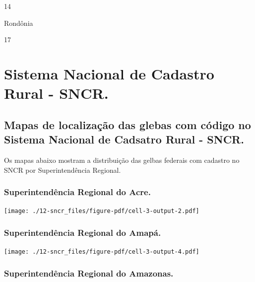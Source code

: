 \documentclass[
  letterpaper,
]{report}
\begin{document}
\n      

14

\n    

\n    

\n      

Rondônia

\n      

17

\n    

\n  

\n


\hypertarget{sistema-nacional-de-cadastro-rural---sncr.}{%
\chapter{Sistema Nacional de Cadastro Rural -
SNCR.}\label{sistema-nacional-de-cadastro-rural---sncr.}}

\hypertarget{mapas-de-localizauxe7uxe3o-das-glebas-com-cuxf3digo-no-sistema-nacional-de-cadsatro-rural---sncr.}{%
\section{Mapas de localização das glebas com código no Sistema Nacional
de Cadsatro Rural -
SNCR.}\label{mapas-de-localizauxe7uxe3o-das-glebas-com-cuxf3digo-no-sistema-nacional-de-cadsatro-rural---sncr.}}

Os mapas abaixo mostram a distribuição das gelbas federais com cadastro
no SNCR por Superintendência Regional.

\hypertarget{superintenduxeancia-regional-do-acre.-2}{%
\subsection{Superintendência Regional do
Acre.}\label{superintenduxeancia-regional-do-acre.-2}}

\texttt{[image: ./12-sncr\_files/figure-pdf/cell-3-output-2.pdf]}

\hypertarget{superintenduxeancia-regional-do-amapuxe1.-2}{%
\subsection{Superintendência Regional do
Amapá.}\label{superintenduxeancia-regional-do-amapuxe1.-2}}

\texttt{[image: ./12-sncr\_files/figure-pdf/cell-3-output-4.pdf]}

\hypertarget{superintenduxeancia-regional-do-amazonas.-2}{%
\subsection{Superintendência Regional do
Amazonas.}\label{superintenduxeancia-regional-do-amazonas.-2}}
\end{document}
